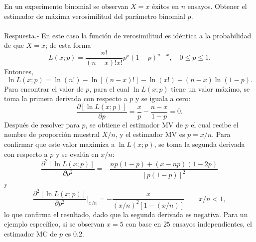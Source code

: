 \setcounter{ejem}{5}
\begin{ejem}
    En un experimento binomial se observan $X=x$ éxitos en $n$ ensayos. Obtener el estimador de máxima verosimilitud del parámetro binomial $p$.\\\\
	Respuesta.-\; En este caso la función de verosimilitud es idéntica a la probabilidad de que $X=x$; de esta forma
	$$L(x;p)=\dfrac{n!}{(n-x)!x!}p^x(1-p)^{n-x},\quad 0\leq p\leq 1.$$
	Entonces,
	$$\ln L(x;p)=\ln(n!)-\ln\left[(n-x)!\right]-\ln(x!)+(n-x)\ln(1-p).$$
	Para encontrar el valor de $p$, para el cual $\ln L(x;p)$ tiene un valor máximo, se toma la primera derivada con respecto a $p$ y se iguala a cero:
	$$\dfrac{\partial \left[\ln L(x;p)\right]}{\partial p}=\dfrac{x}{p}-\dfrac{n-x}{1-p}=0.$$
	Después de resolver para $p$, se obtiene el estimador MV de $p$ el cual recibe el nombre de proporción muestral $X/n$, y el estimador MV es $p=x/n$. Para confirmar que este valor maximiza a $\ln L(x;p)$, se toma la segunda derivada con respecto a $p$ y se evalúa en $x/n$:
	$$\dfrac{\partial^2\left[\ln L(x;p)\right]}{\partial p^2}=-\dfrac{np(1-p)+(x-np)(1-2p)}{\left[p(1-p)\right]^2}$$
	y
	$$\dfrac{\partial^2\left[\ln L(x;p)\right]}{\partial p^2}\bigg|_{x/n} = -\dfrac{x}{(x/n)^2\left[1-(x/n)\right]}\qquad x/n<1,$$
	lo que confirma el resultado, dado que la segunda derivada es negativa. Para un ejemplo específico, si se observan $x=5$ con base en $25$ ensayos independientes, el estimador MC de $p$ es $0.2.$
\end{ejem}

